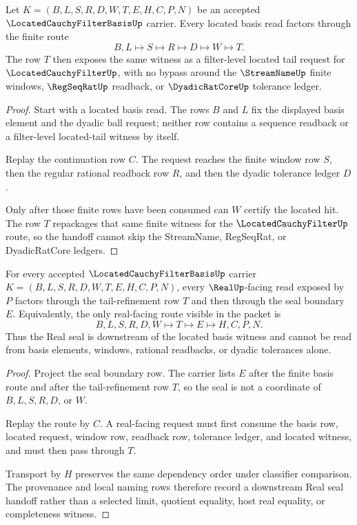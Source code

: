 \begin{theorem}
\label{thm:cauchy-filter-basis-real-tail-refinement}
Let $K=(B,L,S,R,D,W,T,E,H,C,P,N)$ be an accepted $\LocatedCauchyFilterBasisUp$ carrier. Every located basis read factors through the finite route
$$
B,L \longmapsto S \longmapsto R \longmapsto D \longmapsto W \longmapsto T .
$$
The row $T$ then exposes the same witness as a filter-level located tail request for $\LocatedCauchyFilterUp$, with no bypass around the $\StreamNameUp$ finite windows, $\RegSeqRatUp$ readback, or $\DyadicRatCoreUp$ tolerance ledger.
\end{theorem}
\begin{proof}
Start with a located basis read. The rows $B$ and $L$ fix the displayed basis element and the dyadic ball request; neither row contains a sequence readback or a filter-level located-tail witness by itself.

Replay the continuation row $C$. The request reaches the finite window row $S$, then the regular rational readback row $R$, and then the dyadic tolerance ledger $D$.

Only after those finite rows have been consumed can $W$ certify the located hit. The row $T$ repackages that same finite witness for the $\LocatedCauchyFilterUp$ route, so the handoff cannot skip the StreamName, RegSeqRat, or DyadicRatCore ledgers.
\end{proof}

\begin{theorem}
\label{thm:cauchy-filter-basis-real-seal-handoff}
For every accepted $\LocatedCauchyFilterBasisUp$ carrier $K=(B,L,S,R,D,W,T,E,H,C,P,N)$, every $\RealUp$-facing read exposed by $P$ factors through the tail-refinement row $T$ and then through the seal boundary $E$. Equivalently, the only real-facing route visible in the packet is
$$
B,L,S,R,D,W \longmapsto T \longmapsto E \longmapsto H,C,P,N .
$$
Thus the Real seal is downstream of the located basis witness and cannot be read from basis elements, windows, rational readbacks, or dyadic tolerances alone.
\end{theorem}
\begin{proof}
Project the seal boundary row. The carrier lists $E$ after the finite basis route and after the tail-refinement row $T$, so the seal is not a coordinate of $B,L,S,R,D$, or $W$.

Replay the route by $C$. A real-facing request must first consume the basis row, located request, window row, readback row, tolerance ledger, and located witness, and must then pass through $T$.

Transport by $H$ preserves the same dependency order under classifier comparison. The provenance and local naming rows therefore record a downstream Real seal handoff rather than a selected limit, quotient equality, host real equality, or completeness witness.
\end{proof}

